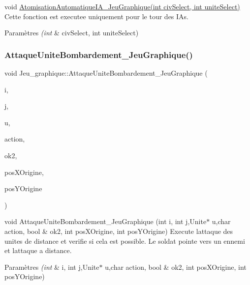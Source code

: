 void \hyperlink{classJeu__graphique_af4ade29c26e98e7bb22ed47577daaba2}{Atomisation\+Automatique\+I\+A\+\_\+\+Jeu\+Graphique(int civ\+Select, int unite\+Select)} Cette fonction est executee uniquement pour le tour des I\+As. 


\begin{DoxyParams}{Paramètres}
{\em (int} & civ\+Select, int unite\+Select) \\
\hline
\end{DoxyParams}
\mbox{\label{classJeu__graphique_a0d85885796e5749b14cbcb005209042e}} 
\subsubsection{\texorpdfstring{Attaque\+Unite\+Bombardement\+\_\+\+Jeu\+Graphique()}{AttaqueUniteBombardement\_JeuGraphique()}}
{\footnotesize\ttfamily void Jeu\+\_\+graphique\+::\+Attaque\+Unite\+Bombardement\+\_\+\+Jeu\+Graphique (\begin{DoxyParamCaption}\item[{int}]{i,  }\item[{int}]{j,  }\item[{\hyperlink{classUnite}{Unite} $\ast$}]{u,  }\item[{char}]{action,  }\item[{bool \&}]{ok2,  }\item[{int}]{pos\+X\+Origine,  }\item[{int}]{pos\+Y\+Origine }\end{DoxyParamCaption})}



void Attaque\+Unite\+Bombardement\+\_\+\+Jeu\+Graphique (int i, int j,Unite$\ast$ u,char action, bool \& ok2, int pos\+X\+Origine, int pos\+Y\+Origine) Execute l\textquotesingle{}attaque des unites de distance et verifie si cela est possible. Le soldat pointe vers un ennemi et l\textquotesingle{}attaque a distance. 


\begin{DoxyParams}{Paramètres}
{\em (int} & i, int j,Unite$\ast$ u,char action, bool \& ok2, int pos\+X\+Origine, int pos\+Y\+Origine) \\
\hline
\end{DoxyParams}
\mbox{\label{classJeu__graphique_aae9e116a4e3651b22ba244957d98e076}} 
